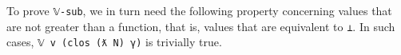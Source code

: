 To prove \texttt{𝕍-sub}, we in turn need the following property
concerning values that are not greater than a function, that is, values
that are equivalent to \texttt{⊥}. In such cases,
\texttt{𝕍\ v\ (clos\ (ƛ\ N)\ γ\textquotesingle{})} is trivially true.

\begin{fence}
\begin{code}%
\>[0]\AgdaSpace{}%
\AgdaSymbol{:}\AgdaSpace{}%
\AgdaSpace{}%
\AgdaSymbol{:}\AgdaSpace{}%
\AgdaSymbol{\}\{}\AgdaSymbol{\}\{}\AgdaSpace{}%
\AgdaSymbol{:}\AgdaSpace{}%
\AgdaSpace{}%
\AgdaSymbol{\}\{}\AgdaSpace{}%
\AgdaSymbol{:}\AgdaSpace{}%
\AgdaSpace{}%
\AgdaOperator{\AgdaInductiveConstructor{,}}\AgdaSpace{}%
\AgdaSpace{}%
\AgdaSpace{}%
\AgdaSpace{}%
\AgdaSymbol{\}}\<%
\\
\>[0][@{}l@{\AgdaIndent{0}}]%
\>[4]%
\>[852I]\AgdaSpace{}%
\AgdaSpace{}%
\<%
\\
\>[.][@{}l@{}]\<[852I]%
\>[6]\AgdaComment{-------------------}\<%
\\
%
\>[4]\AgdaSpace{}%
\AgdaSpace{}%
\AgdaSpace{}%
\AgdaSymbol{(}\AgdaSpace{}%
\AgdaSymbol{(}\AgdaSpace{}%
\AgdaSymbol{)}\AgdaSpace{}%
\AgdaSymbol{)}\<%
\\
\>[0]\AgdaSpace{}%
\AgdaSymbol{\{}\AgdaSymbol{\}}\AgdaSpace{}%
\AgdaSpace{}%
\AgdaSymbol{=}\AgdaSpace{}%
\<%
\\
\>[0]\AgdaSpace{}%
\AgdaSymbol{\{}\AgdaSpace{}%
\AgdaSpace{}%
\AgdaSymbol{\}}\AgdaSpace{}%
\AgdaSpace{}%
\AgdaSymbol{=}\AgdaSpace{}%
\AgdaSpace{}%
\AgdaSymbol{(}\AgdaSpace{}%
\AgdaSpace{}%
\AgdaSpace{}%
\AgdaOperator{\AgdaInductiveConstructor{,}}\AgdaSpace{}%
\AgdaSpace{}%
\AgdaSpace{}%
\AgdaOperator{\AgdaInductiveConstructor{,}}\AgdaSpace{}%
\AgdaSpace{}%

\end{code}
\end{fence}
